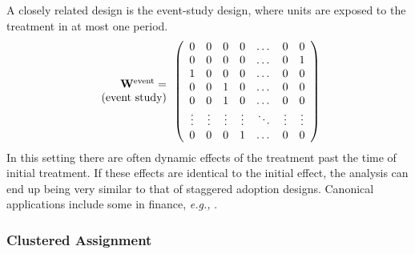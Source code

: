 \documentclass[letterpaper,12pt,leqno]{article}
\newcommand{\ttock}{1}
\newcommand{\ttick}{0}
\newcommand{\bw}{{\bf W}}
\begin{document}
A closely related design is the event-study design, where units are exposed to the treatment in at most one period.
\[
\begin{array}{r}{\bw^{\mathrm{event}}=} \\
{(\text{event study})}
\end{array}\left(
\begin{array}{ccccccccc}
	\ttick &  \ttick & \ttick  & \ttick & \dots & \ttick & \ttick \\
	\ttick  & \ttick &  \ttick & \ttick   & \dots  & \ttick& {\ttock}  \\
 \ttock  & \ttick &  \ttick & \ttick   & \dots  & \ttick& {\ttick}  \\
	\ttick  & \ttick &  \ttock  & \ttick  & \dots  & \ttick& {\ttick}  \\
	\ttick  & \ttick & \ttock &  {\ttick}   & \dots & \ttick & {\ttick}  \\
	\vdots   &  \vdots  &  \vdots& \vdots &\ddots &\vdots &\vdots \\
	\ttick  & {\ttick} &  {\ttick}   & {\ttock} & \dots  & \ttick& {\ttick}  \\
\end{array}
\right)
\]
In this setting there are often dynamic effects of the treatment past the time of initial treatment. If these effects are identical to the initial effect, the analysis can end up being very similar to that of staggered adoption designs. 
Canonical applications include some in finance, {\it e.g.,} \cite{fama1969adjustment}.



\subsubsection{Clustered Assignment}
\end{document}
